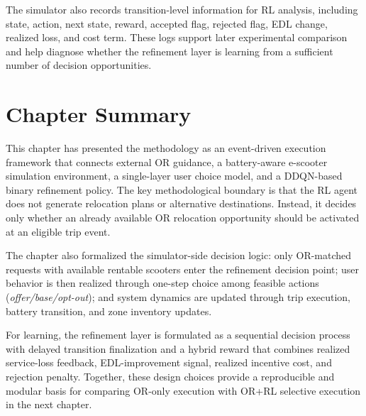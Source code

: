 The simulator also records transition-level information for RL analysis, including state, action, next state, reward, accepted flag, rejected flag, EDL change, realized loss, and cost term. These logs support later experimental comparison and help diagnose whether the refinement layer is learning from a sufficient number of decision opportunities.

\section{Chapter Summary}

This chapter has presented the methodology as an event-driven execution framework that connects external OR guidance, a battery-aware e-scooter simulation environment, a single-layer user choice model, and a DDQN-based binary refinement policy. The key methodological boundary is that the RL agent does not generate relocation plans or alternative destinations. Instead, it decides only whether an already available OR relocation opportunity should be activated at an eligible trip event.

The chapter also formalized the simulator-side decision logic: only OR-matched requests with available rentable scooters enter the refinement decision point; user behavior is then realized through one-step choice among feasible actions (\textit{offer/base/opt-out}); and system dynamics are updated through trip execution, battery transition, and zone inventory updates.

For learning, the refinement layer is formulated as a sequential decision process with delayed transition finalization and a hybrid reward that combines realized service-loss feedback, EDL-improvement signal, realized incentive cost, and rejection penalty. Together, these design choices provide a reproducible and modular basis for comparing OR-only execution with OR+RL selective execution in the next chapter.
